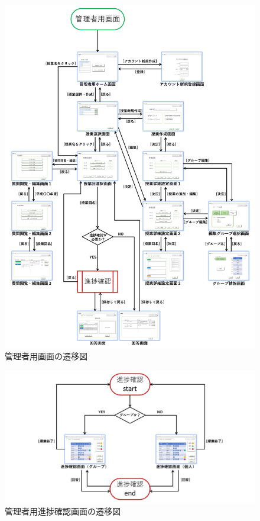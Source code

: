 \begin{figure}[htbp]
  \begin{center}
    \includegraphics[width=1\linewidth,clip]{./img/for_manager.png}
    \caption{管理者用画面の遷移図}\label{fig:for_manager}
  \end{center}
\end{figure}

\begin{figure}[htbp]
  \begin{center}
    \includegraphics[width=1\linewidth,clip]{./img/prog_check.png}
    \caption{管理者用進捗確認画面の遷移図}\label{fig:prog_check}
  \end{center}
\end{figure}
